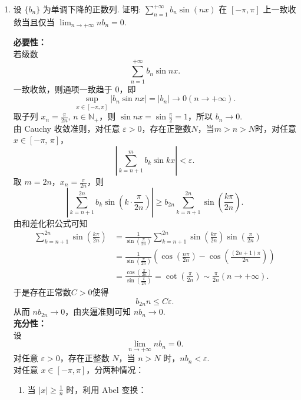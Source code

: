 \begin{enumerate}
    \item[9.]设 $\{b_{n}\}$ 为单调下降的正数列. 证明: 
    \(\displaystyle \sum_{n = 1}^{+\infty} b_{n} \sin(nx)\) 在 \([- \pi,\pi ]\) 上一致收敛当且仅当 \(\displaystyle \lim_{n\to +\infty}n b_{n} = 0\).
    \begin{solution}
        \textbf{必要性：}\\
        若级数
        \[
        \sum_{n=1}^{+\infty}b_n\sin nx.
        \]
        一致收敛，则通项一致趋于 0，即 
        \[
        \sup_{x\in[-\pi,\pi]} |b_n \sin nx| =\left|b_n\right|\to 0(n\to+\infty).
        \]
        取子列 $\displaystyle x_n=\frac{\pi}{2n},\,n\in\mathbb{N}_+$，则 $\displaystyle \sin nx = \sin\frac{\pi}{2}=1$，所以 $b_n\to 0$.\\
        由 Cauchy 收敛准则，对任意 $\varepsilon>0$，存在正整数$N$，当$m>n>N$时，对任意 $x\in [-\pi,\,\pi]$，
        \[
        \left|\sum_{k=n+1}^{m} b_k \sin kx\right|<\varepsilon.
        \]
        取 $m=2n$，$\displaystyle x_n=\frac{\pi}{2n}$，则
        \[
        \left|\sum_{k=n+1}^{2n} b_k \sin\left(k\cdot\frac{\pi}{2n}\right)\right| \ge b_{2n} \sum_{k=n+1}^{2n} \sin\left(\frac{k\pi}{2n}\right).
        \]
        由和差化积公式可知
        \[
        \begin{aligned}
        \sum_{k=n+1}^{2n}\sin\left(\frac{k\pi}{2n}\right)&=\frac{1}{\sin\left(\frac{\pi}{2n}\right)}\sum_{k=n+1}^{2n}\sin\left(\frac{k\pi}{2n}\right)\sin\left(\frac{\pi}{2n}\right)\\
        &=\frac{1}{\sin\left(\frac{\pi}{2n}\right)}\left(\cos\left(\frac{n\pi}{2n}\right)-\cos\left(\frac{(2n+1)\pi}{2n}\right)\right)\\
        &=\frac{\cos\left(\frac{\pi}{2n}\right)}{\sin\left(\frac{\pi}{2n}\right)}=\cot\left(\frac{\pi}{2n}\right)\sim \frac{\pi}{2n}(n\to +\infty).
        \end{aligned}
        \]
        于是存在正常数$C>0$使得
        \[
        b_{2n} n \le C\varepsilon.
        \]
        从而 $n b_{2n}\to 0$，由夹逼准则可知 $n b_n\to 0$.\\
        \textbf{充分性：}\\
        设 
        \[
        \lim_{n\to+\infty} n b_n = 0.
        \]
        对任意 $\varepsilon>0$，存在正整数 $N$，当 $n>N$ 时，$n b_n < \varepsilon$.\\
        对任意 $x\in[-\pi,\pi]$，分两种情况：
        \begin{enumerate}
        \item 当 $\displaystyle |x|\ge \frac{1}{n}$ 时，利用 Abel 变换：\\

\end{enumerate}
\end{solution}
\end{enumerate}
